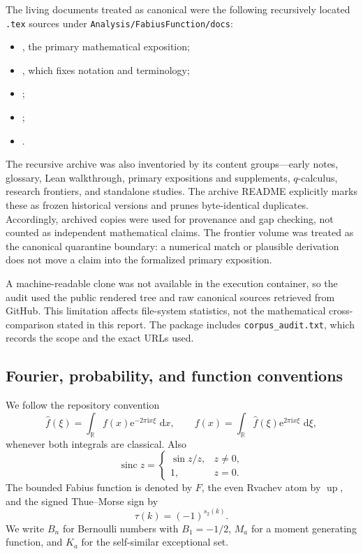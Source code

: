 \documentclass[11pt,oneside]{article}
\numberwithin{equation}{section}
\theoremstyle{definition}
\theoremstyle{remark}
\newcommand{\R}{\mathbb R}
\newcommand{\Up}{\operatorname{up}}
\newcommand{\sinc}{\operatorname{sinc}}
\newcommand{\wt}{s_2}
\newcommand{\dd}{\,\mathrm d}
\newcommand{\e}{\mathrm e}
\newcommand{\ii}{\mathrm i}
\begin{document}
The living documents treated as canonical were the following recursively
located \texttt{.tex} sources under \texttt{Analysis/FabiusFunction/docs}:
\begin{itemize}
\item {},
  the primary mathematical exposition;
\item {},
  which fixes notation and terminology;
\item {};
\item {};
\item {}.
\end{itemize}
The recursive archive was also inventoried by its content groups---early notes,
glossary, Lean walkthrough, primary expositions and supplements, $q$-calculus,
research frontiers, and standalone studies.  The archive README explicitly
marks these as frozen historical versions and prunes byte-identical duplicates.
Accordingly, archived copies were used for provenance and gap checking, not
counted as independent mathematical claims.  The frontier volume was treated
as the canonical quarantine boundary: a numerical match or plausible
derivation does not move a claim into the formalized primary exposition.

A machine-readable clone was not available in the execution container, so the
audit used the public rendered tree and raw canonical sources retrieved from
GitHub.  This limitation affects file-system statistics, not the mathematical
cross-comparison stated in this report.  The package includes
\texttt{corpus\_audit.txt}, which records the scope and the exact URLs used.

\subsection{Fourier, probability, and function conventions}

We follow the repository convention
\begin{equation}\label{p6:eq:fourier-convention}
 \widehat f(\xi)=\int_{\R}f(x)\e^{-2\pi\ii x\xi}\,\dd x,
 \qquad
 f(x)=\int_{\R}\widehat f(\xi)\e^{2\pi\ii x\xi}\,\dd\xi,
\end{equation}
whenever both integrals are classical.  Also
\[
 \sinc z=\begin{cases}\sin z/z,&z\ne0,\\1,&z=0.\end{cases}
\]
The bounded Fabius function is denoted by $F$, the even Rvachev atom by $\Up$,
and the signed Thue--Morse sign by
\[
 \tau(k)=(-1)^{\wt(k)}.
\]
We write $B_n$ for Bernoulli numbers with $B_1=-1/2$, $M_a$ for a moment
generating function, and $K_a$ for the self-similar exceptional set.
\end{document}
